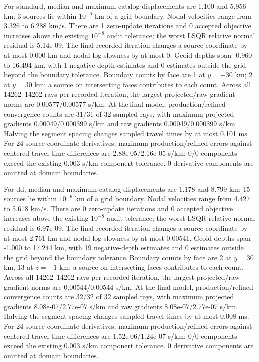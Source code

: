 For standard, median and maximum catalog displacements are 1.100 and 5.956 km; 3 sources lie within $10^{-6}$ km of a grid boundary. Nodal velocities range from 3.326 to 6.288 km/s. There are 1 zero-update iterations and 0 accepted objective increases above the existing $10^{-8}$ audit tolerance; the worst LSQR relative normal residual is 5.14e-09. The final recorded iteration changes a source coordinate by at most 0.000 km and nodal log slowness by at most 0. Geoid depths span -0.960 to 16.494 km, with 1 negative-depth estimates and 0 estimates outside the grid beyond the boundary tolerance. Boundary counts by face are 1 at $y=-30$ km; 2 at $y=30$ km; a source on intersecting faces contributes to each count. Across all 14262--14262 rays per recorded iteration, the largest projected/raw gradient norms are 0.00577/0.00577 s/km. At the final model, production/refined convergence counts are 31/31 of 32 sampled rays, with maximum projected gradients 0.00049/0.000399 s/km and raw gradients 0.00049/0.000399 s/km. Halving the segment spacing changes sampled travel times by at most 0.101 ms. For 24 source-coordinate derivatives, maximum production/refined errors against centered travel-time differences are 2.88e-05/2.16e-05 s/km; 0/0 components exceed the existing 0.003 s/km component tolerance. 0 derivative components are omitted at domain boundaries.

For dd, median and maximum catalog displacements are 1.178 and 8.799 km; 15 sources lie within $10^{-6}$ km of a grid boundary. Nodal velocities range from 4.427 to 5.618 km/s. There are 0 zero-update iterations and 0 accepted objective increases above the existing $10^{-8}$ audit tolerance; the worst LSQR relative normal residual is 6.97e-09. The final recorded iteration changes a source coordinate by at most 2.761 km and nodal log slowness by at most 0.00541. Geoid depths span -1.000 to 17.244 km, with 19 negative-depth estimates and 0 estimates outside the grid beyond the boundary tolerance. Boundary counts by face are 2 at $y=30$ km; 13 at $z=-1$ km; a source on intersecting faces contributes to each count. Across all 14262--14262 rays per recorded iteration, the largest projected/raw gradient norms are 0.00544/0.00544 s/km. At the final model, production/refined convergence counts are 32/32 of 32 sampled rays, with maximum projected gradients 8.08e-07/2.77e-07 s/km and raw gradients 8.08e-07/2.77e-07 s/km. Halving the segment spacing changes sampled travel times by at most 0.008 ms. For 24 source-coordinate derivatives, maximum production/refined errors against centered travel-time differences are 1.52e-06/1.24e-07 s/km; 0/0 components exceed the existing 0.003 s/km component tolerance. 0 derivative components are omitted at domain boundaries.

